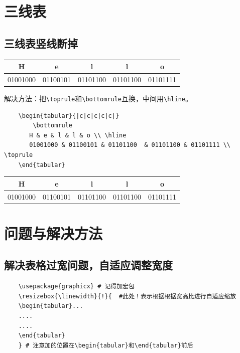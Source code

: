 \section{三线表}

\subsection{三线表竖线断掉}

\begin{table}[ht]
    \centering
    \begin{tabular}{|c|c|c|c|c|}
        \toprule
       H & e & l & l & o \\ \midrule
       01001000 & 01100101 & 01101100  & 01101100 & 01101111 \\ \bottomrule
    \end{tabular}
\end{table}

解决方法：把\verb|\toprule|和\verb|\bottomrule|互换，中间用\verb|\hline|。

\begin{lstlisting}
    \begin{tabular}{|c|c|c|c|c|}
        \bottomrule
       H & e & l & l & o \\ \hline
       01001000 & 01100101 & 01101100  & 01101100 & 01101111 \\ \toprule
    \end{tabular}
\end{lstlisting}

\begin{table}[ht]
    \centering
    \begin{tabular}{|c|c|c|c|c|}
        \bottomrule
       H & e & l & l & o \\ \hline
       01001000 & 01100101 & 01101100  & 01101100 & 01101111 \\ \toprule
    \end{tabular}
\end{table}

\section{问题与解决方法}
\subsection{解决表格过宽问题，自适应调整宽度}

\begin{lstlisting}
    \usepackage{graphicx} # 记得加宏包
    \resizebox{\linewidth}{!}{  #此处！表示根据根据宽高比进行自适应缩放
    \begin{tabular}...
    ....
    ....
    \end{tabular}
    } # 注意加的位置在\begin{tabular}和\end{tabular}前后
\end{lstlisting}


